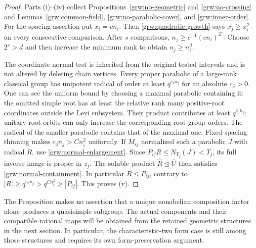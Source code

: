 \begin{proof}
Parts (i)--(iv) collect Propositions~\ref{grw:no-geometric} and
\ref{grw:no-crossing} and Lemmas~\ref{grw:common-field},
\ref{grw:no-parabolic-cover}, and \ref{grw:inner-order}.
For the spacing assertion put $x_i=c n_i$.  Then
\eqref{grw:quadratic-growth} says $x_j\ge x_i^2$ on every consecutive
comparison.  After $s$ comparisons,
$n_j\ge c^{-1}(c n_i)^{2^s}$.  Choose $2^s>d$ and then increase the
minimum rank to obtain $n_j\ge n_i^d$.

The coordinate normal test is inherited from the original tested
intervals and is not altered by deleting chain vertices.  Every proper
parabolic of a large-rank classical group has unipotent radical of
order at least $q^{c_3 n_j}$ for an absolute $c_3>0$.
One can see the uniform bound by choosing a maximal parabolic
containing it: the omitted simple root has at least the relative rank
many positive-root coordinates outside the Levi subsystem.  Their
product contributes at least $q^{c_3 n_j}$; unitary root orbits can
only increase the corresponding root-group orders.  The radical of
the smaller parabolic contains that of the maximal one.
Fixed-spacing thinning makes $c_3n_j>Cn_i^2$ uniformly.
If $M_{ij}$ normalized such a parabolic $J$ with radical $R$, use
\eqref{grw:normal-enlargement}.  Since
$P_{ij}R\le N_{T_j}(J)<T_j$, its full inverse image is proper in
$z_j$.  The soluble product $\widehat R\trianglelefteq\overline U$
then satisfies \eqref{grw:normal-containment}.  In particular
$R\le P_{ij}$,
contrary to $|R|\ge q^{c_3 n_j}>q^{C n_i^2}\ge|P_{ij}|$.
This proves (v).
\end{proof}

The Proposition makes no assertion that a unique nonabelian composition
factor alone produces a quasisimple subgroup.  The actual components
and their compatible rational maps will be obtained from the retained
geometric structures in the next section.  In particular, the
characteristic-two form case is still among those structures and
requires its own form-preservation argument.
